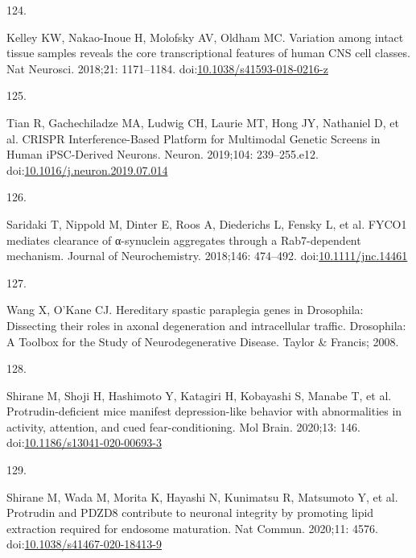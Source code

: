 \documentclass[
  12pt,
  a4paper,
]{book}
\newlength{\cslhangindent}
\newlength{\csllabelwidth}
\newlength{\cslentryspacingunit} %
\newenvironment{CSLReferences}[2] %
 {%
  \setlength{\parindent}{0pt}
  \ifodd #1
  \let\oldpar\par
  \def\par{\hangindent=\cslhangindent\oldpar}
  \fi
  \setlength{\parskip}{#2\cslentryspacingunit}
 }%
 {}
\newcommand{\CSLLeftMargin}[1]{\parbox[t]{\csllabelwidth}{#1}}
\newcommand{\CSLRightInline}[1]{\parbox[t]{\linewidth - \csllabelwidth}{#1}\break}
\begin{document}
\begin{CSLReferences}{0}{0}
\leavevmode{}%
\CSLLeftMargin{124. }%
\CSLRightInline{Kelley KW, Nakao-Inoue H, Molofsky AV, Oldham MC. Variation among intact tissue samples reveals the core transcriptional features of human {CNS} cell classes. Nat Neurosci. 2018;21: 1171--1184. doi:\href{https://doi.org/10.1038/s41593-018-0216-z}{10.1038/s41593-018-0216-z}}

\leavevmode{}%
\CSLLeftMargin{125. }%
\CSLRightInline{Tian R, Gachechiladze MA, Ludwig CH, Laurie MT, Hong JY, Nathaniel D, et al. {CRISPR Interference-Based Platform} for {Multimodal Genetic Screens} in {Human iPSC-Derived Neurons}. Neuron. 2019;104: 239--255.e12. doi:\href{https://doi.org/10.1016/j.neuron.2019.07.014}{10.1016/j.neuron.2019.07.014}}

\leavevmode{}%
\CSLLeftMargin{126. }%
\CSLRightInline{Saridaki T, Nippold M, Dinter E, Roos A, Diederichs L, Fensky L, et al. {FYCO1} mediates clearance of α-synuclein aggregates through a {Rab7-dependent} mechanism. Journal of Neurochemistry. 2018;146: 474--492. doi:\href{https://doi.org/10.1111/jnc.14461}{10.1111/jnc.14461}}

\leavevmode{}%
\CSLLeftMargin{127. }%
\CSLRightInline{Wang X, O'Kane CJ. Hereditary spastic paraplegia genes in {Drosophila}: Dissecting their roles in axonal degeneration and intracellular traffic. Drosophila: {A Toolbox} for the {Study} of {Neurodegenerative Disease}. {Taylor \& Francis}; 2008. }

\leavevmode{}%
\CSLLeftMargin{128. }%
\CSLRightInline{Shirane M, Shoji H, Hashimoto Y, Katagiri H, Kobayashi S, Manabe T, et al. Protrudin-deficient mice manifest depression-like behavior with abnormalities in activity, attention, and cued fear-conditioning. Mol Brain. 2020;13: 146. doi:\href{https://doi.org/10.1186/s13041-020-00693-3}{10.1186/s13041-020-00693-3}}

\leavevmode{}%
\CSLLeftMargin{129. }%
\CSLRightInline{Shirane M, Wada M, Morita K, Hayashi N, Kunimatsu R, Matsumoto Y, et al. Protrudin and {PDZD8} contribute to neuronal integrity by promoting lipid extraction required for endosome maturation. Nat Commun. 2020;11: 4576. doi:\href{https://doi.org/10.1038/s41467-020-18413-9}{10.1038/s41467-020-18413-9}}


\end{CSLReferences}
\end{document}
